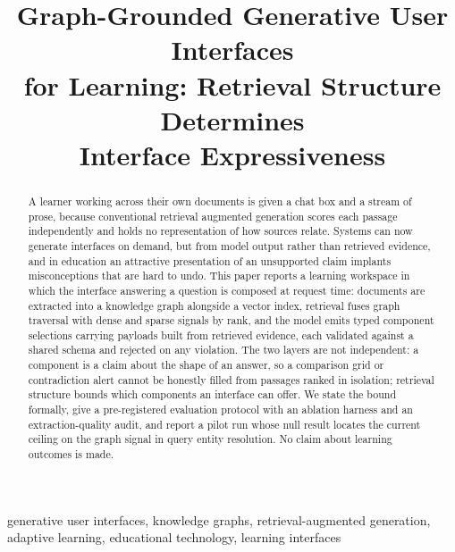 \documentclass[conference]{IEEEtran}
\begin{document}
\title{Graph-Grounded Generative User Interfaces\\ for Learning: Retrieval Structure Determines\\ Interface Expressiveness}

\author{
}

\maketitle

\begin{abstract}
A learner working across their own documents is given a chat box and a stream of prose, because conventional retrieval augmented generation scores each passage independently and holds no representation of how sources relate. Systems can now generate interfaces on demand, but from model output rather than retrieved evidence, and in education an attractive presentation of an unsupported claim implants misconceptions that are hard to undo. This paper reports a learning workspace in which the interface answering a question is composed at request time: documents are extracted into a knowledge graph alongside a vector index, retrieval fuses graph traversal with dense and sparse signals by rank, and the model emits typed component selections carrying payloads built from retrieved evidence, each validated against a shared schema and rejected on any violation. The two layers are not independent: a component is a claim about the shape of an answer, so a comparison grid or contradiction alert cannot be honestly filled from passages ranked in isolation; retrieval structure bounds which components an interface can offer. We state the bound formally, give a pre-registered evaluation protocol with an ablation harness and an extraction-quality audit, and report a pilot run whose null result locates the current ceiling on the graph signal in query entity resolution. No claim about learning outcomes is made.
\end{abstract}

\begin{IEEEkeywords}
generative user interfaces, knowledge graphs, retrieval-augmented generation, adaptive learning, educational technology, learning interfaces
\end{IEEEkeywords}
\end{document}
